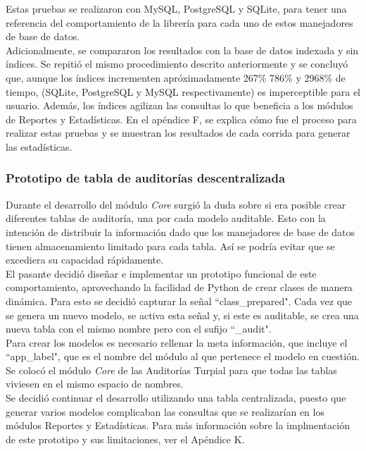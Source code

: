 Estas pruebas se realizaron con MySQL, PostgreSQL y SQLite, para tener una referencia del comportamiento de la librería para cada uno de estos manejadores de base de datos.\\

Adicionalmente, se compararon los resultados con la base de datos indexada y sin índices. Se repitió el mismo procedimiento descrito anteriormente y se concluyó que, aunque los índices incrementen apróximadamente 267\% 786\% y 2968\% de tiempo, (SQLite, PostgreSQL y MySQL respectivamente) es imperceptible para el usuario. Además, los índices agilizan las consultas lo que beneficia a los módulos de Reportes y Estadísticas. En el apéndice F, se explica cómo fue el proceso para realizar estas pruebas y se muestran los resultados de cada corrida para generar las estadísticas.

\subsubsection{Prototipo de tabla de auditorías descentralizada}

Durante el desarrollo del módulo \textit{Core} surgió la duda sobre si era posible crear diferentes tablas de auditoría, una por cada modelo auditable. Esto con la intención de distribuir la información dado que los manejadores de base de datos tienen almacenamiento limitado para cada tabla. Así se podría evitar que se excediera su capacidad rápidamente. \\

El pasante decidió diseñar e implementar un prototipo funcional de este comportamiento, aprovechando la facilidad de Python de crear clases de manera dinámica. Para esto se decidió capturar la señal “class\_prepared". Cada vez que se genera un nuevo modelo, se activa esta señal y, si este es auditable, se crea una nueva tabla con el mismo nombre pero con el sufijo “\_audit". \\

Para crear los modelos es necesario rellenar la meta información, que incluye el “app\_label", que es el nombre del módulo al que pertenece el modelo en cuestión. Se colocó el módulo \textit{Core} de las Auditorías Turpial para que todas las tablas viviesen en el mismo espacio de nombres.\\

Se decidió continuar el desarrollo utilizando una tabla centralizada, puesto que generar varios modelos complicaban las consultas que se realizarían en los módulos Reportes y Estadísticas. Para más información sobre la implmentación de este prototipo y sus limitaciones, ver el Apéndice K.

